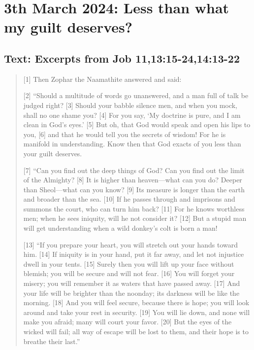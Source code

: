 \setcounter{figure}{0}

\section{3th March 2024: Less than what my guilt deserves?}
\subsection*{Text: Excerpts from Job 11,13:15-24,14:13-22}
  \begin{quote}
    [1] Then Zophar the Naamathite answered and said:

    [2] “Should a multitude of words go unanswered,
        and a man full of talk be judged right?
    [3] Should your babble silence men,
        and when you mock, shall no one shame you?
    [4] For you say, ‘My doctrine is pure,
        and I am clean in God’s eyes.’
    [5] But oh, that God would speak
        and open his lips to you,
    [6] and that he would tell you the secrets of wisdom!
        For he is manifold in understanding.
    Know then that God exacts of you less than your guilt deserves.

    [7] “Can you find out the deep things of God?
        Can you find out the limit of the Almighty?
    [8] It is higher than heaven—what can you do?
        Deeper than Sheol—what can you know?
    [9] Its measure is longer than the earth
        and broader than the sea.
    [10] If he passes through and imprisons
        and summons the court, who can turn him back?
    [11] For he knows worthless men;
        when he sees iniquity, will he not consider it?
    [12] But a stupid man will get understanding
        when a wild donkey’s colt is born a man!

    [13] “If you prepare your heart,
        you will stretch out your hands toward him.
    [14] If iniquity is in your hand, put it far away,
        and let not injustice dwell in your tents.
    [15] Surely then you will lift up your face without blemish;
        you will be secure and will not fear.
    [16] You will forget your misery;
        you will remember it as waters that have passed away.
    [17] And your life will be brighter than the noonday;
        its darkness will be like the morning.
    [18] And you will feel secure, because there is hope;
        you will look around and take your rest in security.
    [19] You will lie down, and none will make you afraid;
        many will court your favor.
    [20] But the eyes of the wicked will fail;
        all way of escape will be lost to them,
        and their hope is to breathe their last.”


\end{quote}

